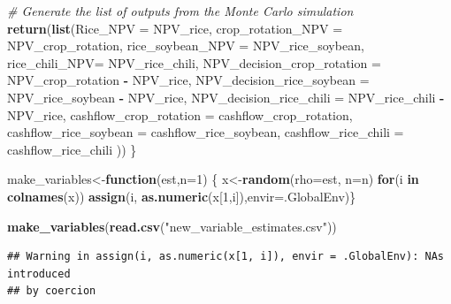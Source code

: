 \documentclass[
]{article}
\newenvironment{Shaded}{\begin{snugshade}}{\end{snugshade}}
\newcommand{\AttributeTok}[1]{\textcolor[rgb]{0.13,0.29,0.53}{#1}}
\newcommand{\CommentTok}[1]{\textcolor[rgb]{0.56,0.35,0.01}{\textit{#1}}}
\newcommand{\ControlFlowTok}[1]{\textcolor[rgb]{0.13,0.29,0.53}{\textbf{#1}}}
\newcommand{\DecValTok}[1]{\textcolor[rgb]{0.00,0.00,0.81}{#1}}
\newcommand{\FunctionTok}[1]{\textcolor[rgb]{0.13,0.29,0.53}{\textbf{#1}}}
\newcommand{\NormalTok}[1]{#1}
\newcommand{\OtherTok}[1]{\textcolor[rgb]{0.56,0.35,0.01}{#1}}
\newcommand{\SpecialCharTok}[1]{\textcolor[rgb]{0.81,0.36,0.00}{\textbf{#1}}}
\newcommand{\StringTok}[1]{\textcolor[rgb]{0.31,0.60,0.02}{#1}}
\begin{document}
\begin{Shaded}
\begin{Highlighting}[]
  
  \CommentTok{\# Generate the list of outputs from the Monte Carlo simulation}
  \FunctionTok{return}\NormalTok{(}\FunctionTok{list}\NormalTok{(}\AttributeTok{Rice\_NPV =}\NormalTok{ NPV\_rice,}
              \AttributeTok{crop\_rotation\_NPV =}\NormalTok{ NPV\_crop\_rotation,}
              \AttributeTok{rice\_soybean\_NPV =}\NormalTok{ NPV\_rice\_soybean,}
              \AttributeTok{rice\_chili\_NPV=}\NormalTok{ NPV\_rice\_chili,}
              \AttributeTok{NPV\_decision\_crop\_rotation =}\NormalTok{ NPV\_crop\_rotation }\SpecialCharTok{{-}}\NormalTok{ NPV\_rice,}
              \AttributeTok{NPV\_decision\_rice\_soybean =}\NormalTok{ NPV\_rice\_soybean }\SpecialCharTok{{-}}\NormalTok{ NPV\_rice,}
              \AttributeTok{NPV\_decision\_rice\_chili =}\NormalTok{ NPV\_rice\_chili }\SpecialCharTok{{-}}\NormalTok{ NPV\_rice,}
              \AttributeTok{cashflow\_crop\_rotation =}\NormalTok{ cashflow\_crop\_rotation,}
              \AttributeTok{cashflow\_rice\_soybean =}\NormalTok{ cashflow\_rice\_soybean,}
              \AttributeTok{cashflow\_rice\_chili =}\NormalTok{ cashflow\_rice\_chili}
\NormalTok{  ))}
\NormalTok{\}}


\NormalTok{make\_variables}\OtherTok{\textless{}{-}}\ControlFlowTok{function}\NormalTok{(est,}\AttributeTok{n=}\DecValTok{1}\NormalTok{)}
\NormalTok{\{ x}\OtherTok{\textless{}{-}}\FunctionTok{random}\NormalTok{(}\AttributeTok{rho=}\NormalTok{est, }\AttributeTok{n=}\NormalTok{n)}
\ControlFlowTok{for}\NormalTok{(i }\ControlFlowTok{in} \FunctionTok{colnames}\NormalTok{(x)) }\FunctionTok{assign}\NormalTok{(i, }\FunctionTok{as.numeric}\NormalTok{(x[}\DecValTok{1}\NormalTok{,i]),}\AttributeTok{envir=}\NormalTok{.GlobalEnv)\}}

\FunctionTok{make\_variables}\NormalTok{(}\FunctionTok{read.csv}\NormalTok{(}\StringTok{"new\_variable\_estimates.csv"}\NormalTok{))}
\end{Highlighting}
\end{Shaded}

\begin{verbatim}
## Warning in assign(i, as.numeric(x[1, i]), envir = .GlobalEnv): NAs introduced
## by coercion
\end{verbatim}
\end{document}

